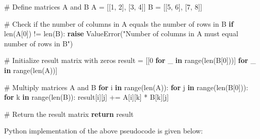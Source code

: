 \documentclass[
  letterpaper,
  DIV=11,
  numbers=noendperiod]{scrreprt}
\newenvironment{Shaded}{\begin{snugshade}}{\end{snugshade}}
\newcommand{\BuiltInTok}[1]{\textcolor[rgb]{0.00,0.23,0.31}{#1}}
\newcommand{\CommentTok}[1]{\textcolor[rgb]{0.37,0.37,0.37}{#1}}
\newcommand{\ControlFlowTok}[1]{\textcolor[rgb]{0.00,0.23,0.31}{\textbf{#1}}}
\newcommand{\DecValTok}[1]{\textcolor[rgb]{0.68,0.00,0.00}{#1}}
\newcommand{\KeywordTok}[1]{\textcolor[rgb]{0.00,0.23,0.31}{\textbf{#1}}}
\newcommand{\NormalTok}[1]{\textcolor[rgb]{0.00,0.23,0.31}{#1}}
\newcommand{\OperatorTok}[1]{\textcolor[rgb]{0.37,0.37,0.37}{#1}}
\newcommand{\PreprocessorTok}[1]{\textcolor[rgb]{0.68,0.00,0.00}{#1}}
\newcommand{\StringTok}[1]{\textcolor[rgb]{0.13,0.47,0.30}{#1}}
\theoremstyle{plain}
\theoremstyle{definition}
\theoremstyle{remark}
\begin{document}
\begin{Shaded}
\begin{Highlighting}[]
\CommentTok{\# Define matrices A and B}
\NormalTok{A }\OperatorTok{=}\NormalTok{ [[}\DecValTok{1}\NormalTok{, }\DecValTok{2}\NormalTok{], [}\DecValTok{3}\NormalTok{, }\DecValTok{4}\NormalTok{]]}
\NormalTok{B }\OperatorTok{=}\NormalTok{ [[}\DecValTok{5}\NormalTok{, }\DecValTok{6}\NormalTok{], [}\DecValTok{7}\NormalTok{, }\DecValTok{8}\NormalTok{]]}

\CommentTok{\# Check if the number of columns in A equals the number of rows in B}
\ControlFlowTok{if} \BuiltInTok{len}\NormalTok{(A[}\DecValTok{0}\NormalTok{]) }\OperatorTok{!=} \BuiltInTok{len}\NormalTok{(B):}
    \ControlFlowTok{raise} \PreprocessorTok{ValueError}\NormalTok{(}\StringTok{"Number of columns in A must equal number of rows in B"}\NormalTok{)}

\CommentTok{\# Initialize result matrix with zeros}
\NormalTok{result }\OperatorTok{=}\NormalTok{ [[}\DecValTok{0} \ControlFlowTok{for}\NormalTok{ \_ }\KeywordTok{in} \BuiltInTok{range}\NormalTok{(}\BuiltInTok{len}\NormalTok{(B[}\DecValTok{0}\NormalTok{]))] }\ControlFlowTok{for}\NormalTok{ \_ }\KeywordTok{in} \BuiltInTok{range}\NormalTok{(}\BuiltInTok{len}\NormalTok{(A))]}

\CommentTok{\# Multiply matrices A and B}
\ControlFlowTok{for}\NormalTok{ i }\KeywordTok{in} \BuiltInTok{range}\NormalTok{(}\BuiltInTok{len}\NormalTok{(A)):}
    \ControlFlowTok{for}\NormalTok{ j }\KeywordTok{in} \BuiltInTok{range}\NormalTok{(}\BuiltInTok{len}\NormalTok{(B[}\DecValTok{0}\NormalTok{])):}
        \ControlFlowTok{for}\NormalTok{ k }\KeywordTok{in} \BuiltInTok{range}\NormalTok{(}\BuiltInTok{len}\NormalTok{(B)):}
\NormalTok{            result[i][j] }\OperatorTok{+=}\NormalTok{ A[i][k] }\OperatorTok{*}\NormalTok{ B[k][j]}

\CommentTok{\# Return the result matrix}
\ControlFlowTok{return}\NormalTok{ result}
\end{Highlighting}
\end{Shaded}

Python implementation of the above pseudocode is given below:
\end{document}
